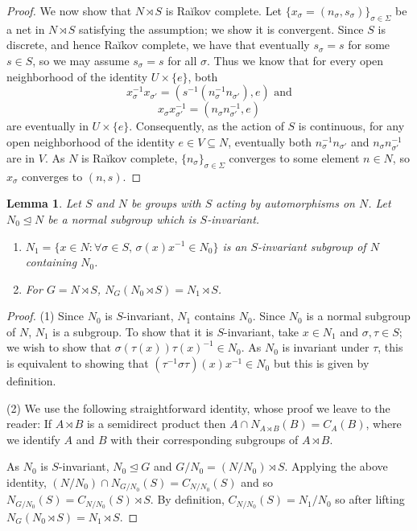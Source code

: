 \documentclass[10pt,a4paper]{amsart}
\theoremstyle{plain}
\newtheorem{lemma}[theorem]{Lemma}
\theoremstyle{definition}
\newcounter{step}
\begin{document}
\begin{proof}
    We now show that $N\rtimes S$ is Ra\u{i}kov complete. Let $\{x_\sigma=(n_\sigma,s_\sigma)\}_{\sigma\in \Sigma}$ be a net in $N\rtimes S$ satisfying the assumption; we show it is convergent. Since $S$ is discrete, and hence Ra\u{i}kov complete, we have that eventually $s_\sigma=s$ for some $s\in S$, so we may assume $s_\sigma=s$ for all $\sigma$.  Thus we know that for every open neighborhood of the identity $U\times \{e\}$, both
 \[x_\sigma^{-1}x_{\sigma'}=(s^{-1}(n_\sigma^{-1}n_{\sigma'}),e) \text{ and}\]
    \[x_{\sigma}x_{\sigma'}^{-1}=(n_\sigma n_{\sigma'}^{-1},e)\] are eventually in $U\times\{e\}$. Consequently, as the action of $S$ is continuous, for any open neighborhood of the identity $e\in V\subseteq N$, eventually both  $n_\sigma^{-1}n_{\sigma'}$ and $n_\sigma n_{\sigma'}^{-1}$ are in $V$. As $N$ is  Ra\u{i}kov complete, $\{n_\sigma\}_{\sigma\in \Sigma}$ converges to some element $n\in N$, so $x_\sigma$ converges to $(n,s)$.
\end{proof}


\begin{lemma}\label{L: one step}
    Let $S$ and $N$ be groups with $S$ acting by automorphisms on $N$. Let $N_0\trianglelefteq N$ be a normal subgroup which is $S$-invariant.
    \begin{enumerate}
        \item $N_1=\{x\in N: \forall \sigma\in S,\, \sigma(x)x^{-1}\in N_0\}$ is an $S$-invariant subgroup of $N$ containing $N_0$.
        \item For $G=N\rtimes S$, $N_G(N_0\rtimes S)=N_1\rtimes S$.
    \end{enumerate}
\end{lemma}

\begin{proof}
    (1) Since $N_0$ is $S$-invariant, $N_1$ contains $N_0$. Since $N_0$ is a normal subgroup of $N$, $N_1$ is a subgroup. To show that it is $S$-invariant,  take $x\in N_1$ and $\sigma,\tau\in S$; we wish to show that $\sigma(\tau(x))\tau(x)^{-1}\in N_0$. As $N_0$ is invariant under $\tau$, this is equivalent to showing that $(\tau^{-1}\sigma\tau)(x)x^{-1}\in N_0$ but this is given by definition.

    (2) We use the following straightforward identity, whose proof we leave to the reader: If $A\rtimes B$ is a semidirect product then $A\cap N_{A\rtimes B}(B)=C_A(B)$, where we identify $A$ and $B$ with their corresponding subgroups of $A\rtimes B$.

    As $N_0$ is $S$-invariant, $N_0\trianglelefteq G$ and  $G/N_0=(N/N_0)\rtimes S$. Applying the above identity, $(N/N_0)\cap N_{G/N_0}(S)=C_{N/N_0}(S)$ and so $N_{G/N_0}(S)=C_{N/N_0}(S)\rtimes S$. By definition, $C_{N/N_0}(S)=N_1/N_0$ so after lifting $N_G(N_0\rtimes S)=N_1\rtimes S$.
\end{proof}
\end{document}
